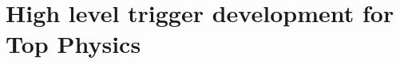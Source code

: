 \chapter{High level trigger development for Top Physics}
\label{c:service_work}
\ifpdf
    \graphicspath{{04_Service_work/plots/}}
\else
    \graphicspath{{04_Service_work/plots/EPS/}{04_Service_work/plots/}}
\fi



